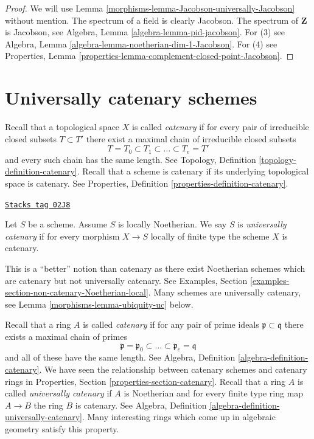 \begin{proof}

We will use Lemma \ref{morphisms-lemma-Jacobson-universally-Jacobson} without mention.
The spectrum of a field is clearly Jacobson.
The spectrum of $\mathbf{Z}$ is Jacobson, see
Algebra, Lemma \ref{algebra-lemma-pid-jacobson}.
For (3) see
Algebra, Lemma \ref{algebra-lemma-noetherian-dim-1-Jacobson}.
For (4) see
Properties, Lemma \ref{properties-lemma-complement-closed-point-Jacobson}.
\end{proof}

\section{Universally catenary schemes}
\label{morphisms-section-universally-catenary}
Recall that a topological space $X$ is called {\it catenary} if
for every pair of irreducible closed subsets $T \subset T'$
there exist a maximal chain of irreducible closed subsets
$$
T = T_0 \subset T_1 \subset \ldots \subset T_e = T'
$$
and every such chain has the same length. See
Topology, Definition \ref{topology-definition-catenary}.
Recall that a scheme is catenary if its underlying topological space
is catenary. See Properties, Definition \ref{properties-definition-catenary}.

\begin{definition}
\label{morphisms-definition-universally-catenary}
\href{https://stacks.math.columbia.edu/tag/02J8}{\texttt{Stacks tag 02J8}}

Let $S$ be a scheme. Assume $S$ is locally Noetherian.
We say $S$ is {\it universally catenary} if for every
morphism $X \to S$ locally of finite type the scheme $X$ is catenary.
\end{definition}

This is a ``better'' notion than catenary as there exist Noetherian schemes
which are catenary but not universally catenary. See
Examples, Section \ref{examples-section-non-catenary-Noetherian-local}.
Many schemes are universally catenary, see
Lemma \ref{morphisms-lemma-ubiquity-uc} below.

\medskip\noindent
Recall that a ring $A$ is called {\it catenary} if
for any pair of prime ideals $\mathfrak p \subset \mathfrak q$
there exists a maximal chain of primes
$$
\mathfrak p =
\mathfrak p_0 \subset \ldots \subset \mathfrak p_e
= \mathfrak q
$$
and all of these have the same length. See
Algebra, Definition \ref{algebra-definition-catenary}.
We have seen the relationship between catenary schemes and
catenary rings in Properties, Section \ref{properties-section-catenary}.
Recall that a ring $A$ is called {\it universally catenary} if
$A$ is Noetherian and for every finite type ring map $A \to B$
the ring $B$ is catenary. See
Algebra, Definition \ref{algebra-definition-universally-catenary}.
Many interesting rings which come up
in algebraic geometry satisfy this property.

